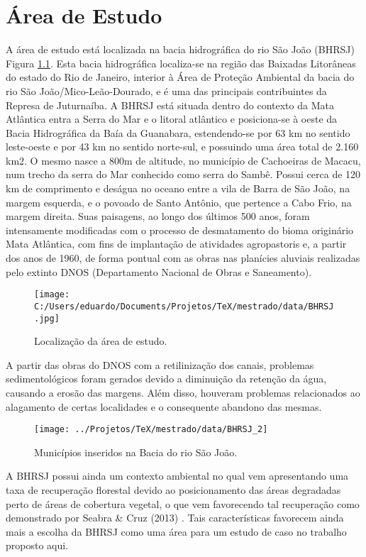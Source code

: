 \chapter{Área de Estudo}
A área de estudo está localizada na bacia hidrográfica do rio São João (BHRSJ) Figura \ref{fig:locareaestudo}. Esta bacia hidrográfica localiza-se na região das Baixadas Litorâneas do estado do Rio de Janeiro, interior à Área de Proteção Ambiental da bacia do rio São João/Mico-Leão-Dourado, e é uma das principais contribuintes da Represa de Juturnaíba. A BHRSJ está situada dentro do contexto da Mata Atlântica entra a Serra do Mar e o litoral atlântico e posiciona-se à oeste da Bacia Hidrográfica da Baía da Guanabara, estendendo-se por 63 km no sentido leste-oeste e por 43 km no sentido norte-sul, e possuindo uma área total de 2.160 km2. O mesmo nasce a 800m de altitude, no município de Cachoeiras de Macacu, num trecho da serra do Mar conhecido como serra do Sambê. Possui cerca de 120 km de comprimento e deságua no oceano entre a vila de Barra de São João, na margem esquerda, e o povoado de Santo Antônio, que pertence a Cabo Frio, na margem direita. Suas paisagens, ao longo dos últimos 500 anos, foram intensamente modificadas com o processo de desmatamento do bioma originário Mata Atlântica, com fins de implantação de atividades agropastoris e, a partir dos anos de 1960, de forma pontual com as obras nas planícies aluviais realizadas pelo extinto DNOS (Departamento Nacional de Obras e Saneamento). \\

	\begin{figure}
		\centering
		\texttt{[image: C:/Users/eduardo/Documents/Projetos/TeX/mestrado/data/BHRSJ.jpg]}
		\caption{Localização da área de estudo.}
		\label{fig:locareaestudo}
	\end{figure}


A partir das obras do DNOS com a retilinização dos canais, problemas sedimentológicos foram gerados devido a diminuição da retenção da água, causando a erosão das margens. Além disso, houveram problemas relacionados ao alagamento de certas localidades e o consequente abandono das mesmas. \\

	\begin{figure}
		\centering
		\texttt{[image: ../Projetos/TeX/mestrado/data/BHRSJ\_2]}
		\caption{Municípios inseridos na Bacia do rio São João.}
		\label{fig:bhrsj2}
	\end{figure}


A BHRSJ possui ainda um contexto ambiental no qual vem apresentando uma taxa de recuperação florestal devido ao posicionamento das áreas degradadas perto de áreas de cobertura vegetal, o que vem favorecendo tal recuperação como demonstrado por Seabra \& Cruz (2013) \cite{SEABRA_CRUZ}. Tais características favorecem ainda mais a escolha da BHRSJ como uma área para um estudo de caso no trabalho proposto aqui. \\
